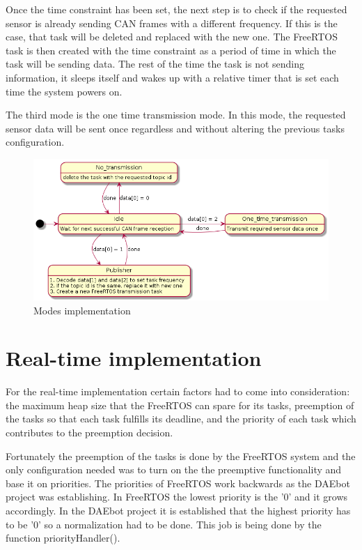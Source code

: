 \documentclass[12pt]{report}%
\begin{document}
Once the time constraint has been set, the next step is to check if the requested sensor is already sending CAN frames with a different frequency. If this is the case, that task will be deleted and replaced with the new one. The FreeRTOS task is then created with the time constraint as a period of time in which the task will be sending data. The rest of the time the task is not sending information, it sleeps itself and wakes up with a relative timer that is set each time the system powers on.

The third mode is the one time transmission mode. In this mode, the requested sensor data will be sent once regardless and without altering the previous tasks configuration.

\begin{figure}[ht]
	\centering
	\includegraphics[width=\textwidth]{states}
    \caption{Modes implementation}
    \label{fig:states}
\end{figure}

\section{Real-time implementation}
\label{sect:realtime}
For the real-time implementation certain factors had to come into consideration: the maximum heap size that the FreeRTOS can spare for its tasks, preemption of the tasks so that each task fulfills its deadline, and the priority of each task which contributes to the preemption decision.

Fortunately the preemption of the tasks is done by the FreeRTOS system and the only configuration needed was to turn on the the preemptive functionality and base it on priorities. The priorities of FreeRTOS work backwards as the DAEbot project was establishing. In FreeRTOS the lowest priority is the '0' and it grows accordingly. In the DAEbot project it is established that the highest priority has to be '0' so a normalization had to be done. This job is being done by the function priorityHandler().
\end{document}
